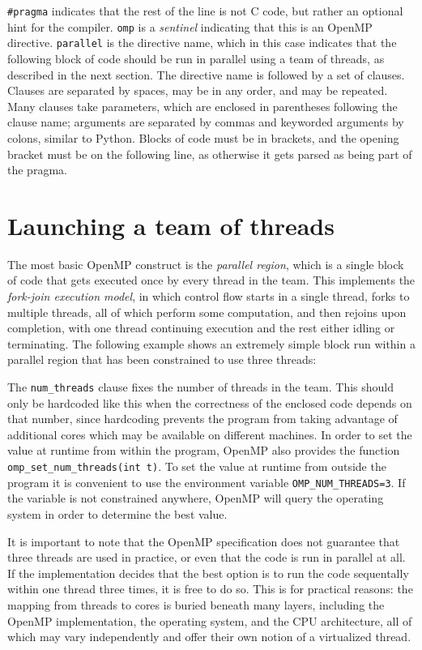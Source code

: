 \documentclass[conference, a4paper]{IEEEtran-modified}
\begin{document}
    \texttt{\#pragma} indicates that the rest of the line is not C code, but rather an optional hint for the compiler. \texttt{omp} is a \emph{sentinel} indicating that this is an OpenMP directive. \texttt{parallel} is the directive name, which in this case indicates that the following block of code should be run in parallel using a team of threads, as described in the next section. The directive name is followed by a set of clauses. Clauses are separated by spaces, may be in any order, and may be repeated. Many clauses take parameters, which are enclosed in parentheses following the clause name; arguments are separated by commas and keyworded arguments by colons, similar to Python. Blocks of code must be in brackets, and the opening bracket must be on the following line, as otherwise it gets parsed as being part of the pragma.
    


\section{Launching a team of threads}

    The most basic OpenMP construct is the \emph{parallel region}, which is a single block of code that gets executed once by every thread in the team. This implements the \emph{fork-join execution model}, in which control flow starts in a single thread, forks to multiple threads, all of which perform some computation, and then rejoins upon completion, with one thread continuing execution and the rest either idling or terminating. The following example shows an extremely simple block run within a parallel region that has been constrained to use three threads:


    The \texttt{num\_threads} clause fixes the number of threads in the team. This should only be hardcoded like this when the correctness of the enclosed code depends on that number, since hardcoding prevents the program from taking advantage of additional cores which may be available on different machines. In order to set the value at runtime from within the program, OpenMP also provides the function \texttt{omp_set_num_threads(int t)}. To set the value at runtime from outside the program it is convenient to use the environment variable \texttt{OMP_NUM_THREADS=3}. If the variable is not constrained anywhere, OpenMP will query the operating system in order to determine the best value. 


    It is important to note that the OpenMP specification does not guarantee that three threads are used in practice, or even that the code is run in parallel at all. If the implementation decides that the best option is to run the code sequentally within one thread three times, it is free to do so. This is for practical reasons: the mapping from threads to cores is buried beneath many layers, including the OpenMP implementation, the operating system, and the CPU architecture, all of which may vary independently and offer their own notion of a virtualized thread.
\end{document}
